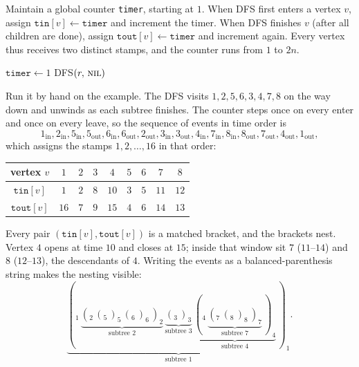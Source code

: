 Maintain a global counter \texttt{timer}, starting at $1$. When DFS first enters a
vertex $v$, assign $\texttt{tin}[v]\leftarrow\texttt{timer}$ and increment the timer.
When DFS finishes $v$ (after all children are done), assign $\texttt{tout}[v]
\leftarrow\texttt{timer}$ and increment again. Every vertex thus receives two distinct
stamps, and the counter runs from $1$ to $2n$.

\begin{algorithm}[H]
\caption{In/out timestamps via DFS}
\label{ch21:alg-tinout}
\DontPrintSemicolon
{}
$\texttt{timer}\leftarrow 1$\;
\textsc{DFS}$(r,\,\textsc{nil})$\;
\end{algorithm}

Run it by hand on the example. The DFS visits $1,2,5,6,3,4,7,8$ on the way down and
unwinds as each subtree finishes. The counter steps once on every enter and once on every
leave, so the sequence of events in time order is
\[
1_{\text{in}},2_{\text{in}},5_{\text{in}},5_{\text{out}},6_{\text{in}},6_{\text{out}},
2_{\text{out}},3_{\text{in}},3_{\text{out}},4_{\text{in}},7_{\text{in}},8_{\text{in}},
8_{\text{out}},7_{\text{out}},4_{\text{out}},1_{\text{out}},
\]
which assigns the stamps $1,2,\dots,16$ in that order:

\begin{center}
\begin{tabular}{c|cccccccc}
\toprule
vertex $v$ & $1$ & $2$ & $3$ & $4$ & $5$ & $6$ & $7$ & $8$\\
\midrule
$\texttt{tin}[v]$  & $1$  & $2$ & $8$  & $10$ & $3$ & $5$ & $11$ & $12$\\
$\texttt{tout}[v]$ & $16$ & $7$ & $9$  & $15$ & $4$ & $6$ & $14$ & $13$\\
\bottomrule
\end{tabular}
\end{center}

Every pair $(\texttt{tin}[v],\texttt{tout}[v])$ is a matched bracket, and the brackets
nest. Vertex $4$ opens at time $10$ and closes at $15$; inside that window sit $7$
($11$--$14$) and $8$ ($12$--$13$), the descendants of $4$. Writing the events as a
balanced-parenthesis string makes the nesting visible:
\[
\underbrace{(_1\,\underbrace{(_2\,(_5\,)_5\,(_6\,)_6\,)_2}_{\text{subtree }2}\,
\underbrace{(_3\,)_3}_{\text{subtree }3}\,
\underbrace{(_4\,\underbrace{(_7\,(_8\,)_8\,)_7}_{\text{subtree }7}\,)_4}_{\text{subtree }4}\,)_1}_{\text{subtree }1}.
\]

